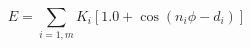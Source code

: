 \documentclass[12pt]{article}
\begin{document}
$$  
  E = \sum_{i=1,m} K_i  [ 1.0 + \cos ( n_i \phi - d_i ) ]
$$
\end{document}
